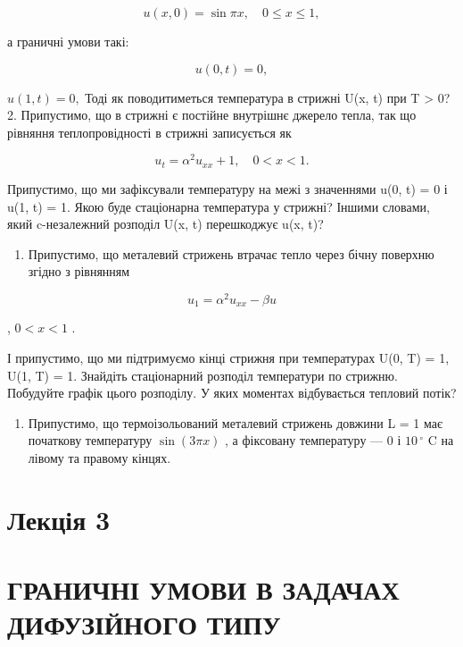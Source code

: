 \documentclass[
  ukrainian,
]{article}
\providecommand{\tightlist}{%
  \setlength{\itemsep}{0pt}\setlength{\parskip}{0pt}}
\begin{document}
\[
u(x, 0) = \sin \pi x, \quad 0 \leqslant x \leqslant 1,
\]

а граничні умови такі:

\[
u(0, t) = 0,
\]

\(u(1, t) = 0,\) Тоді як поводитиметься температура в стрижні U(x, t)
при T \textgreater{} 0? 2. Припустимо, що в стрижні є постійне внутрішнє
джерело тепла, так що рівняння теплопровідності в стрижні записується як

\[
u_t = \alpha^2 u_{xx} + 1, \quad 0 < x < 1.
\]

Припустимо, що ми зафіксували температуру на межі з значеннями u(0, t) =
0 і u(1, t) = 1. Якою буде стаціонарна температура у стрижні? Іншими
словами, який c-незалежний розподіл U(x, t) перешкоджує u(x, t)?

\begin{enumerate}
\def\labelenumi{\arabic{enumi}.}
\setcounter{enumi}{2}
\tightlist
\item
  Припустимо, що металевий стрижень втрачає тепло через бічну поверхню
  згідно з рівнянням
\end{enumerate}

\[
u_1 = \alpha^2 u_{xx} - \beta u
\]

, \(0 < x < 1\) .

І припустимо, що ми підтримуємо кінці стрижня при температурах U(0, T) =
1, U(1, T) = 1. Знайдіть стаціонарний розподіл температури по стрижню.
Побудуйте графік цього розподілу. У яких моментах відбувається тепловий
потік?

\begin{enumerate}
\def\labelenumi{\arabic{enumi}.}
\setcounter{enumi}{3}
\tightlist
\item
  Припустимо, що термоізольований металевий стрижень довжини L = 1 має
  початкову температуру \(\sin(3\pi x)\) , а фіксовану температуру --- 0
  і \(10\,^{\circ}\) C на лівому та правому кінцях.
\end{enumerate}

\section{Лекція 3}\label{ux43bux435ux43aux446ux456ux44f-3}

\section{ГРАНИЧНІ УМОВИ В ЗАДАЧАХ ДИФУЗІЙНОГО
ТИПУ}\label{ux433ux440ux430ux43dux438ux447ux43dux456-ux443ux43cux43eux432ux438-ux432-ux437ux430ux434ux430ux447ux430ux445-ux434ux438ux444ux443ux437ux456ux439ux43dux43eux433ux43e-ux442ux438ux43fux443}
\end{document}
